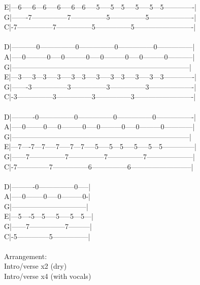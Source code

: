 {E|---6-----6---6-----6-----6---6-----5-----5---5-----5-----5---5-------------|\\
G|-------7---------------7---------------5---------------5-------------------|\\
C|-7---------------7---------------5---------------5-------------------------|\\
\\
D|-----------0---------------0---------------0---------------0---------------|\\
A|-----0---------0-----0---------0-----0---------0-----0---------0-----------|\\
G|---------------------------------------------------------------------------|\\
E|---3-----3---3-----3-----3---3-----3-----3---3-----3-----3---3-------------|\\
G|-------3---------------3---------------3---------------3-------------------|\\
C|-3---------------3---------------3---------------3-------------------------|\\
\\
D|----------0---------------0---------------0---------------0----------------|\\
A|-----0--------0-----0---------0-----0---------0-----0---------0------------|\\
G|---------------------------------------------------------------------------|\\
E|---7----7---7-----7-----7---7-----5-----5---5-----5-----5---5--------------|\\
G|------7---------------7---------------7---------------7--------------------|\\
C|-7--------------7---------------6---------------6--------------------------|\\
\ \\
D|----------0---------------0-----|\\
A|-----0--------0-----0---------0-|\\
G|--------------------------------|\\
E|---5----5---5-----5-----5---5---|\\
G|------7---------------7---------|\\
C|-5--------------5---------------|\\
\\
Arrangement:\\
Intro/verse x2 (dry)\\
Intro/verse x4 (with vocals)\\
}
